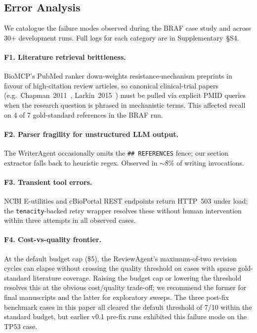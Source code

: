 \documentclass[11pt]{article}
\begin{document}
\subsection{Error Analysis}
\label{sec:error-analysis}

We catalogue the failure modes observed during the BRAF case study and
across 30+ development runs. Full logs for each category are in
Supplementary~\S S4.

\paragraph{F1. Literature retrieval brittleness.}
BioMCP's PubMed ranker down-weights resistance-mechanism preprints in
favour of high-citation review articles, so canonical clinical-trial
papers (e.g.\ Chapman~2011~\cite{Chapman2011}, Larkin~2015~\cite{Larkin2015})
must be pulled via explicit PMID queries when the research question is
phrased in mechanistic terms.
This affected recall on 4 of 7 gold-standard references in the BRAF run.

\paragraph{F2. Parser fragility for unstructured LLM output.}
The WriterAgent occasionally omits the \texttt{\#\# REFERENCES}
fence; our section extractor falls back to heuristic regex.
Observed in ${\sim}8\%$ of writing invocations.

\paragraph{F3. Transient tool errors.}
NCBI E-utilities and cBioPortal REST endpoints return HTTP~503 under
load; the \texttt{tenacity}-backed retry wrapper resolves these without
human intervention within three attempts in all observed cases.

\paragraph{F4. Cost-vs-quality frontier.}
At the default budget cap (\$5), the ReviewAgent's maximum-of-two
revision cycles can elapse without crossing the quality threshold on
cases with sparse gold-standard literature coverage.
Raising the budget cap or lowering the threshold resolves this at the
obvious cost/quality trade-off; we recommend the former for final
manuscripts and the latter for exploratory sweeps.
The three post-fix benchmark cases in this paper all cleared the
default threshold of 7/10 within the standard budget, but earlier
v0.1 pre-fix runs exhibited this failure mode on the TP53 case.
\end{document}
